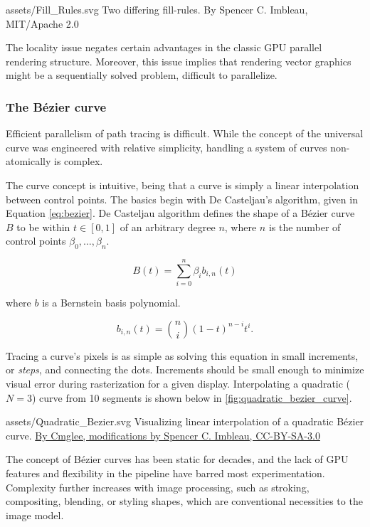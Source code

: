 \svg
{assets/Fill_Rules.svg}
{\label{fig:fill_rule}Two differing fill-rules.}
{By Spencer C. Imbleau, MIT/Apache 2.0}

The locality issue negates certain advantages in the classic GPU parallel rendering structure. Moreover,  this issue implies that rendering vector graphics might be a sequentially solved problem, difficult to parallelize.

\subsubsection{The Bézier curve}
Efficient parallelism of path tracing is difficult. While the concept of the universal curve was engineered with relative simplicity, handling a system of curves non-atomically is complex.\medskip

The curve concept is intuitive, being that a curve is simply a linear interpolation between control points. The basics begin with De Casteljau's algorithm\cite{Pomax22}, given in Equation \cref{eq:bezier}. De Casteljau algorithm defines the shape of a Bézier curve \(B\) to be within \(t \in [0,1]\) of an arbitrary degree \(n\), where \(n\) is the number of control points \(\beta_0, \ldots, \beta_n\).\medskip

\begin{equation}\label{eq:bezier}
B(t) = \sum_{i=0}^{n}\beta_{i}b_{i,n}(t)
\end{equation}
\begin{center}
where \(b\) is a Bernstein basis polynomial.
\end{center}
\[
b_{i,n}(t) = \binom{n}{i}(1-t)^{n-i}t^i.
\]\medskip

Tracing a curve's pixels is as simple as solving this equation in small increments, or \textit{steps}, and connecting the dots. Increments should be small enough to minimize visual error during rasterization for a given display. Interpolating a quadratic (\(N=3\)) curve from 10 segments is shown below in \cref{fig:quadratic_bezier_curve}.\medskip

\svg
{assets/Quadratic_Bezier.svg}
{\label{fig:quadratic_bezier_curve}Visualizing linear interpolation of a quadratic Bézier curve.}
{\href{https://commons.wikimedia.org/wiki/File:Quadratic_Beziers_in_string_art.svg}{By Cmglee, modifications by Spencer C. Imbleau, CC-BY-SA-3.0}}\medskip

The concept of Bézier curves has been static for decades, and the lack of GPU features and flexibility in the pipeline have barred most experimentation. Complexity further increases with image processing, such as stroking, compositing, blending, or styling shapes, which are conventional necessities to the image model.

